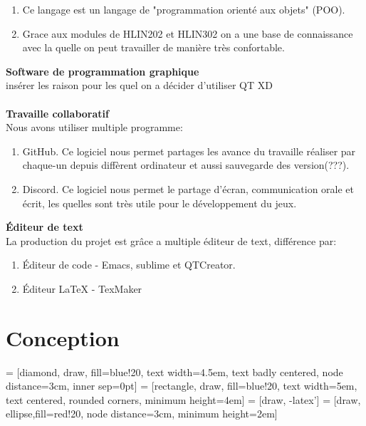 \documentclass{article}
\begin{document}
\begin{enumerate}
\item Ce langage est un langage de "programmation orienté aux objets" (POO).
\item Grace aux modules de HLIN202 et HLIN302 on a une base de connaissance avec la quelle on peut travailler de manière très confortable.
\end{enumerate}
\textbf{\large Software de programmation graphique}\\
insérer les raison pour les quel on a décider d'utiliser QT XD\\~\\
\textbf{\large Travaille collaboratif}\\
Nous avons utiliser multiple programme:
\begin{enumerate}
\item GitHub. Ce logiciel nous permet partages les avance du travaille réaliser par chaque-un depuis diffèrent ordinateur et aussi sauvegarde des version(???).
\item Discord. Ce logiciel nous permet le partage d'écran, communication orale et écrit, les quelles sont très utile pour le développement du jeux.
\end{enumerate}
\textbf{\large Éditeur de text}\\
La production du projet est grâce a multiple éditeur de text, différence par:
\begin{enumerate}
\item Éditeur de code -
Emacs, sublime et QTCreator.
\item Éditeur \LaTeX{} - TexMaker
\end{enumerate} 
\newpage
\section{Conception}


 = [diamond, draw, fill=blue!20, 
    text width=4.5em, text badly centered, node distance=3cm, inner sep=0pt]
 = [rectangle, draw, fill=blue!20, 
    text width=5em, text centered, rounded corners, minimum height=4em]
 = [draw, -latex']
 = [draw, ellipse,fill=red!20, node distance=3cm,
    minimum height=2em]
    
\end{document}
